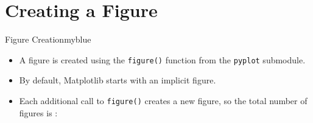 \section{Creating a Figure}
\begin{prettyBox}{Figure Creation}{myblue}
\begin{itemize}
    \item A figure is created using the \texttt{figure()} function from the \texttt{pyplot} submodule.
    \item By default, Matplotlib starts with an implicit figure.
    \item Each additional call to \texttt{figure()} creates a new figure, so the total number of figures is :
        \begin{center}
        \end{center}
\end{itemize}
\end{prettyBox}

\vspace{0.5cm}


